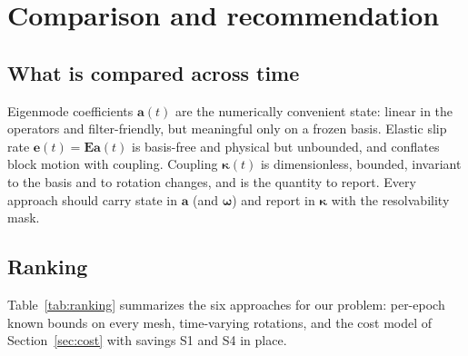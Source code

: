 \documentclass[11pt]{article}
\newcommand{\vect}[1]{\bm{#1}}
\newcommand{\mat}[1]{\mathbf{#1}}
\begin{document}
\section{Comparison and recommendation}

\subsection{What is compared across time}

Eigenmode coefficients $\vect{a}(t)$ are the numerically convenient state: linear in the operators and filter-friendly, but meaningful only on a frozen basis. Elastic slip rate $\vect{e}(t) = \mat{E}\vect{a}(t)$ is basis-free and physical but unbounded, and conflates block motion with coupling. Coupling $\vect{\kappa}(t)$ is dimensionless, bounded, invariant to the basis and to rotation changes, and is the quantity to report. Every approach should carry state in $\vect{a}$ (and $\vect{\omega}$) and report in $\vect{\kappa}$ with the resolvability mask.

\subsection{Ranking}

Table~\ref{tab:ranking} summarizes the six approaches for our problem: per-epoch known bounds on every mesh, time-varying rotations, and the cost model of Section~\ref{sec:cost} with savings S1 and S4 in place.
\end{document}
